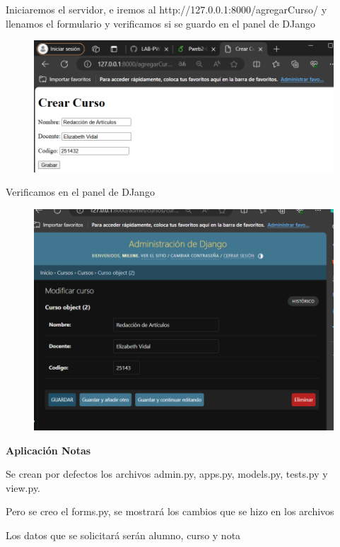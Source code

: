 \documentclass{article}
\begin{document}
 \item Iniciaremos el servidor, e iremos al http://127.0.0.1:8000/agregarCurso/ y llenamos el formulario y verificamos si se guardo en el panel de DJango

     \begin{figure}[H]
           \centering
           \includegraphics[scale=0.6]{latex/img/img9.png}
     \end{figure}
     
 \item Verificamos en el panel de DJango

     \begin{figure}[H]
           \centering
           \includegraphics[scale=0.6]{latex/img/img10.png}
     \end{figure}

\newpage
\textbf{\large Aplicación Notas}
 \item    Se crean por defectos los archivos admin.py, apps.py, models.py, tests.py y view.py. 
 \item    Pero se creo el forms.py, se mostrará los cambios que se hizo en los archivos
  \item  Los datos que se solicitará serán alumno, curso y nota
 
\end{document}
